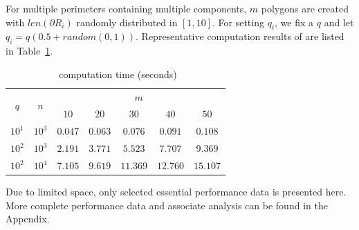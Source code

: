For multiple perimeters containing multiple components, $m$ polygons 
are created with $len(\partial R_i)$ randomly distributed in $[1, 10]$. 
For setting $q_i$, we fix a $q$ and let $q_i = q(0.5 + random(0, 1))$. 
Representative computation results of \algoMRG are listed in 
Table~\ref{eval:mpmc}.
\begin{table}[ht!]
    \vspace*{-2mm}
    \footnotesize
    \centering
    \begin{tabular}{|c|c|c|c|c|c|c|} 
        \hline
        \multirow{2}{*}{$q$} & \multirow{2}{*}{$n$} & \multicolumn{5}{|c|}{$m$} \\ \cline{3-7}
        \rule{0pt}{2.5ex} & & $10$ & $20$ & $30$ & $40$ & $50$ \\ \hline
        \rule{0pt}{2.5ex} $10^1$ & $10^3$ & $ 0.047$ & $ 0.063$ & $ 0.076$ & $ 0.091$ & $ 0.108$ \\ \hline
        \rule{0pt}{2.5ex} $10^2$ & $10^3$ & $ 2.191$ & $ 3.771$ & $ 5.523$ & $ 7.707$ & $ 9.369$ \\ \hline
        \rule{0pt}{2.5ex} $10^2$ & $10^4$ & $ 7.105$ & $ 9.619$ & $11.369$ & $12.760$ & $15.107$ \\ \hline
    \end{tabular}
    \vspace*{-3mm}
    \caption{\label{eval:mpmc} \algoMRG~computation time (seconds)}
    \vspace*{-4mm}
\end{table}

Due to limited space, only selected essential performance data is 
presented here. More complete performance data and associate analysis 
can be found in the Appendix. 

